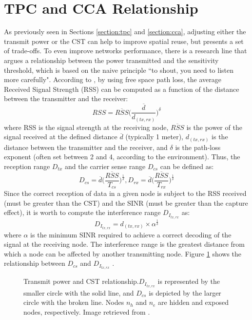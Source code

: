 \documentclass[12pt, a4paper,twoside]{tesi_upf}
\begin{document}
		\section{TPC and CCA Relationship}
		\label{section:tpc_cst_relationship}
			As previously seen in Sections \ref{section:tpc} and \ref{section:cca}, adjusting either the transmit power or the CST can help to improve spatial reuse, but presents a set of trade-offs. To even improve networks performance, there is a research line that argues a relationship between the power transmitted and the sensitivity threshold, which is based on the naive principle ``to shout, you need to listen more carefully". According to \cite{thorpe2014survey}, by using free space path loss, the average Received Signal Strength (RSS) can be computed as a function of the distance between the transmitter and the receiver:		
			\begin{equation}
				RSS = \overline{RSS} \Big( \frac{\overline{d}}{d_{(tx,rx)}} \Big)^{\delta}
				\nonumber
			\end{equation}
			where RSS is the signal strength at the receiving node, $\overline{RSS}$ is the power of the signal received at the defined distance $\overline{d}$ (typically 1 meter), $d_{(tx,rx)}$ is the distance between the transmitter and the receiver, and $\delta$ is the path-loss exponent (often set between 2 and 4, according to the environment).  Thus, the reception range $D_{tx}$ and the carrier sense range $D_{cs}$ can be defined as:
			\begin{equation}
				D_{cs} = \overline{d} \Big( \frac{\overline{RSS}}{T_{cs}} \Big)^\frac{1}{\delta}, 				D_{rx} = \overline{d} \Big( \frac{\overline{RSS}}{T_{rx}} \Big)^\frac{1}{\delta}
				\nonumber
			\end{equation}
			Since the correct reception of data in a given node is subject to the RSS received (must be greater than the CST) and the SINR (must be greater than the capture effect), it is worth to compute the interference range $D_{I_{tx,rx}}$ as:					
			\begin{equation}
				D_{I_{tx,rx}} = d_{(tx,rx)} \times \alpha ^{\frac{1}{\delta}}
				\nonumber
			\end{equation}			
			where $\alpha$ is the minimum SINR required to achieve a correct decoding of the signal at the receiving node. The interference range is the greatest distance from which a node can be affected by another transmitting node. Figure \ref{fig:tx_cca_relation} shows the relationship between $D_{cs}$ and $D_{I_{tx,rx}}$ . 
			\begin{figure}[h!]
				\centering
				\caption{Transmit power and CST relationship.$D_{I_{tx,rx}}$ is represented by the smaller circle with the solid line, and $D_{cs}$ is depicted by the larger circle with the broken line. Nodes $n_h$ and $n_e$ are hidden and exposed nodes, respectively. Image retrieved from \cite{thorpe2014survey}.}
				\label{fig:tx_cca_relation}
			\end{figure}	
		
\end{document}
